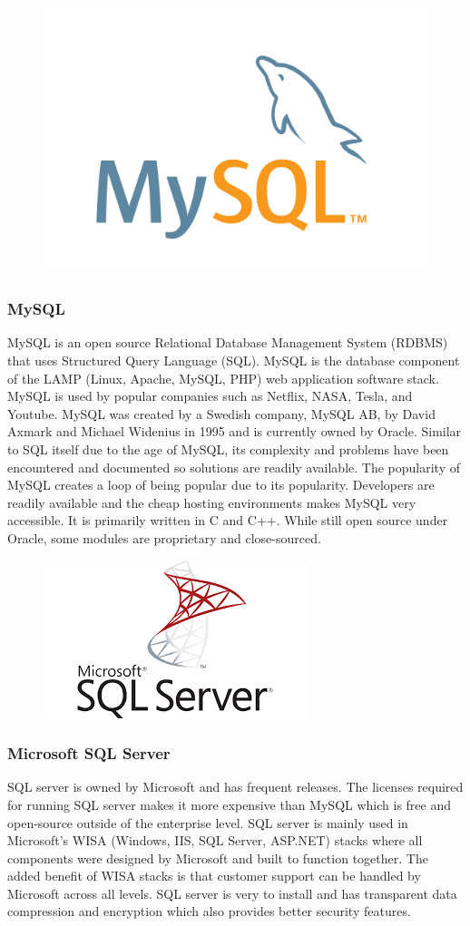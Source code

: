 \documentclass[12pt]{report}
\begin{document}
\begin{figure}[h]
	\centering
	\includegraphics[width=0.251\linewidth]{mysql}
\end{figure}

\subsubsection*{MySQL}

MySQL is an open source Relational Database Management System (RDBMS) that uses Structured Query Language (SQL).  MySQL is the database component of the LAMP (Linux, Apache, MySQL, PHP) web application software stack.  MySQL is used by popular companies such as Netflix, NASA, Tesla, and Youtube.  MySQL was created by a Swedish company, MySQL AB, by David Axmark and Michael Widenius in 1995 and is currently owned by Oracle.  Similar to SQL itself due to the age of MySQL, its complexity and problems have been encountered and documented so solutions are readily available.  The popularity of MySQL creates a loop of being popular due to its popularity.  Developers are readily available and the cheap hosting environments makes MySQL very accessible.  It is primarily written in C and C++.  While still open source under Oracle, some modules are proprietary and close-sourced.

\begin{figure}[h]
	\centering
	\includegraphics[width=0.251\linewidth]{microsoftsql}
\end{figure}

\subsubsection*{Microsoft SQL Server}

SQL server is owned by Microsoft and has frequent releases.  The licenses required for running SQL server makes it more expensive than MySQL which is free and open-source outside of the enterprise level.  SQL server is mainly used in Microsoft’s WISA (Windows, IIS, SQL Server, ASP.NET) stacks where all components were designed by Microsoft and built to function together.  The added benefit of WISA stacks is that customer support can be handled by Microsoft across all levels.  SQL server is very to install and has transparent data compression and encryption which also provides better security features.
\end{document}
